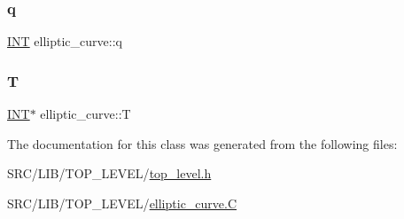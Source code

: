 \subsubsection{\texorpdfstring{q}{q}}
{\footnotesize\ttfamily \mbox{\hyperlink{galois_8h_a09fddde158a3a20bd2dcadb609de11dc}{I\+NT}} elliptic\+\_\+curve\+::q}

\mbox{\label{classelliptic__curve_aa6d73dc15171e7a096ebbdf3aaed5319}} 
\subsubsection{\texorpdfstring{T}{T}}
{\footnotesize\ttfamily \mbox{\hyperlink{galois_8h_a09fddde158a3a20bd2dcadb609de11dc}{I\+NT}}$\ast$ elliptic\+\_\+curve\+::T}



The documentation for this class was generated from the following files\+:\begin{DoxyCompactItemize}
\item 
S\+R\+C/\+L\+I\+B/\+T\+O\+P\+\_\+\+L\+E\+V\+E\+L/\mbox{\hyperlink{top__level_8h}{top\+\_\+level.\+h}}\item 
S\+R\+C/\+L\+I\+B/\+T\+O\+P\+\_\+\+L\+E\+V\+E\+L/\mbox{\hyperlink{elliptic__curve_8_c}{elliptic\+\_\+curve.\+C}}\end{DoxyCompactItemize}
